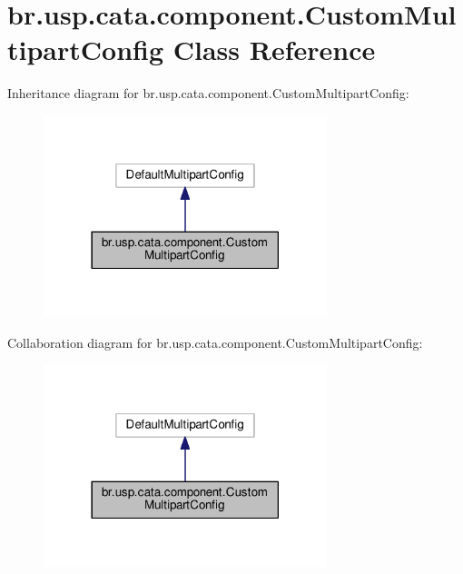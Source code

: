 \hypertarget{classbr_1_1usp_1_1cata_1_1component_1_1_custom_multipart_config}{\section{br.\+usp.\+cata.\+component.\+Custom\+Multipart\+Config Class Reference}
\label{classbr_1_1usp_1_1cata_1_1component_1_1_custom_multipart_config}
}


Inheritance diagram for br.\+usp.\+cata.\+component.\+Custom\+Multipart\+Config\+:\nopagebreak
\begin{figure}[H]
\begin{center}
\leavevmode
\includegraphics[width=234pt]{classbr_1_1usp_1_1cata_1_1component_1_1_custom_multipart_config__inherit__graph}
\end{center}
\end{figure}


Collaboration diagram for br.\+usp.\+cata.\+component.\+Custom\+Multipart\+Config\+:\nopagebreak
\begin{figure}[H]
\begin{center}
\leavevmode
\includegraphics[width=234pt]{classbr_1_1usp_1_1cata_1_1component_1_1_custom_multipart_config__coll__graph}
\end{center}
\end{figure}
